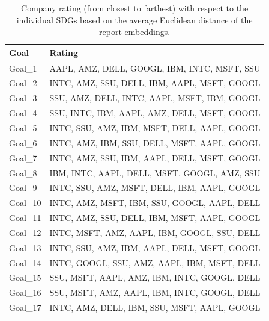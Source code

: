 \documentclass[
]{article}
\begin{document}
\begin{table}

\caption{\label{tab:tab01}Company rating (from closest to farthest) with respect to the individual SDGs based on the average Euclidean distance of the report embeddings.}
\centering
\begin{tabular}[t]{l|l}
\hline
Goal & Rating\\
\hline
Goal\_1 & AAPL, AMZ, DELL, GOOGL, IBM, INTC, MSFT, SSU\\
\hline
Goal\_2 & INTC, AMZ, SSU, DELL, IBM, AAPL, MSFT, GOOGL\\
\hline
Goal\_3 & SSU, AMZ, DELL, INTC, AAPL, MSFT, IBM, GOOGL\\
\hline
Goal\_4 & SSU, INTC, IBM, AAPL, AMZ, DELL, MSFT, GOOGL\\
\hline
Goal\_5 & INTC, SSU, AMZ, IBM, MSFT, DELL, AAPL, GOOGL\\
\hline
Goal\_6 & INTC, AMZ, IBM, SSU, DELL, MSFT, AAPL, GOOGL\\
\hline
Goal\_7 & INTC, AMZ, SSU, IBM, AAPL, DELL, MSFT, GOOGL\\
\hline
Goal\_8 & IBM, INTC, AAPL, DELL, MSFT, GOOGL, AMZ, SSU\\
\hline
Goal\_9 & INTC, SSU, AMZ, MSFT, DELL, IBM, AAPL, GOOGL\\
\hline
Goal\_10 & INTC, AMZ, MSFT, IBM, SSU, GOOGL, AAPL, DELL\\
\hline
Goal\_11 & INTC, AMZ, SSU, DELL, IBM, MSFT, AAPL, GOOGL\\
\hline
Goal\_12 & INTC, MSFT, AMZ, AAPL, IBM, GOOGL, SSU, DELL\\
\hline
Goal\_13 & INTC, SSU, AMZ, IBM, AAPL, DELL, MSFT, GOOGL\\
\hline
Goal\_14 & INTC, GOOGL, SSU, AMZ, AAPL, IBM, MSFT, DELL\\
\hline
Goal\_15 & SSU, MSFT, AAPL, AMZ, IBM, INTC, GOOGL, DELL\\
\hline
Goal\_16 & SSU, MSFT, AMZ, AAPL, IBM, INTC, GOOGL, DELL\\
\hline
Goal\_17 & INTC, AMZ, DELL, IBM, SSU, MSFT, AAPL, GOOGL\\
\hline
\end{tabular}
\end{table}
\end{document}
